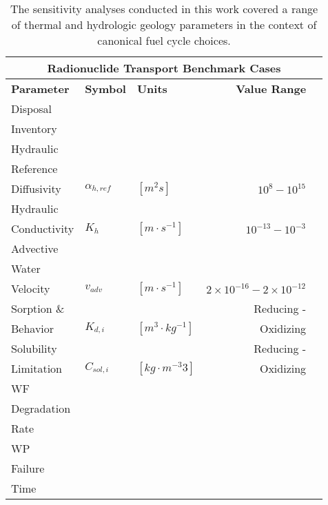\begin{table}[ht!]
\centering
\footnotesize{
\begin{tabular}{|l|l|l|r|r|}
\multicolumn{5}{c}{\textbf{Radionuclide Transport Benchmark Cases}}\\
\hline
\textbf{Parameter} & \textbf{Symbol} & \textbf{Units} & \textbf{Value Range} \\
\hline
Disposal& & & \\
Inventory& & & \\
\hline
Hydraulic & & & \\
Reference & & & \\
Diffusivity& $\alpha_{h,ref}$& $[m^2s]$ & $10^{8} - 10^{15}$ \\
\hline
Hydraulic & & & \\
Conductivity& $K_{h}$& $[m \cdot s^{-1}]$ & $10^{-13} - 10^{-3}$ \\
\hline
Advective  & & & \\
Water & & & \\
Velocity & $v_{adv}$ & $[m\cdot s^{-1}]$ & $2\times10^{-16}-2\times10^{-12}$ \\
\hline
Sorption \& & & & Reducing - \\
Behavior & $K_{d,i}$& $[m^3\cdot kg^{-1}]$ & Oxidizing \\
\hline
Solubility &  & & Reducing -\\
Limitation & $C_{sol,i}$ & $[kg\cdot m^{-3}3]$& Oxidizing \\
\hline
WF& & & \\
Degradation& & & \\
Rate& & & \\
\hline
WP& & & \\
Failure& & & \\
Time& & & \\
\hline
\end{tabular}
\caption{The sensitivity analyses conducted in this work covered a range of 
thermal and hydrologic geology parameters in the context of canonical fuel cycle choices.}
\label{tab:nuclide_bench_tab}
}
\end{table}

